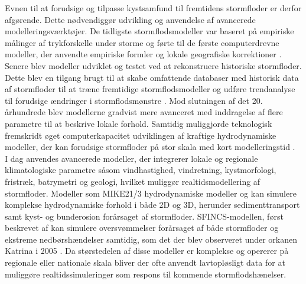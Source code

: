 Evnen til at forudsige og tilpasse kystsamfund til fremtidens stormfloder er derfor afgørende. Dette nødvendiggør udvikling og anvendelse af avancerede modelleringsværktøjer. De tidligste stormflodsmodeller var baseret på empiriske målinger af trykforskelle under storme og førte til de første computerdrevne modeller, der anvendte empiriske formler og lokale geografiske korrektioner \citep{massey_history_2007}. Senere blev modeller udviklet og testet ved at rekonstruere historiske stormfloder. Dette blev en tilgang brugt til at skabe omfattende databaser med historisk data af stormfloder til at træne fremtidige stormflodsmodeller og udføre trendanalyse til forudsige ændringer i stormflodsmønstre \citep{tadesse_database_2021, dang_dataset_2024}. Mod slutningen af det 20. århundrede blev modellerne gradvist mere avanceret med inddragelse af flere parametre til at beskrive lokale forhold. Samtidig muliggjorde teknologisk fremskridt øget computerkapacitet udviklingen af kraftige hydrodynamiske modeller, der kan forudsige stormfloder på stor skala med kort modelleringstid \citep{tadesse_database_2021, massey_history_2007}.\\
I dag anvendes avancerede modeller, der integrerer lokale og regionale klimatologiske parametre såsom vindhastighed, vindretning, kystmorfologi, fristræk, batrymetri og geologi, hvilket muliggør realtidsmodellering af stormfloder. Modeller som MIKE21/3 hydrodynamiske modeller \citep{dhi_mike_2024} og \cite{adcirc_introduction_nodate} kan simulere komplekse hydrodynamiske forhold i både 2D og 3D, herunder sedimenttransport samt kyst- og bunderosion forårsaget af stormfloder. SFINCS-modellen, først beskrevet af \cite{leijnse_modeling_2021} kan simulere oversvømmelser forårsaget af både stormfloder og ekstreme nedbørshændelser samtidig, som det der blev observeret under orkanen Katrina i 2005 \citep{reible_hurricane_2007}. Da størstedelen af disse modeller er komplekse og opererer på regionale eller nationale skala bliver der ofte anvendt lavtopløsligt data for at muliggøre realtidssimuleringer som respons til kommende stormflodshænelser.\\

